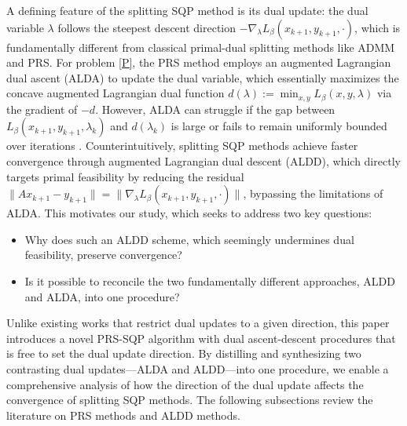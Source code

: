 \documentclass[pdflatex,sn-mathphys-num]{sn-jnl}%
\theoremstyle{thmstyleone}%
\theoremstyle{thmstyletwo}%
\theoremstyle{thmstylethree}%
\begin{document}
A defining feature of the splitting SQP method is its dual update: the dual variable $\lambda$ follows the steepest descent direction $-\nabla_\lambda L_{\beta}(x_{k+1},y_{k+1},\cdot)$, which is fundamentally different from classical primal-dual splitting methods like ADMM and PRS. 
For problem \eqref{P}, the PRS method employs an augmented Lagrangian dual ascent (ALDA) to update the dual variable, which essentially maximizes the concave augmented Lagrangian dual function $d(\lambda):=\min_{x,y} L_{\beta}(x,y,\lambda)$ via the gradient of $-d$. However, ALDA can struggle if the gap between $L_{\beta}(x_{k+1},y_{k+1},\lambda_k)$ and $d(\lambda_k)$ is large or fails to remain uniformly bounded over iterations \cite{SS24}. Counterintuitively, splitting SQP methods achieve faster convergence through augmented Lagrangian dual descent (ALDD), which directly targets primal feasibility by reducing the residual $\|Ax_{k+1}-y_{k+1}\|=\|\nabla_\lambda L_{\beta}(x_{k+1},y_{k+1},\cdot)\|$, bypassing the limitations of ALDA.
This motivates our study, which seeks to address two key questions:
\begin{itemize}
	\item Why does such an ALDD scheme, which seemingly undermines dual feasibility, preserve convergence?
	
	\item Is it possible to reconcile the two fundamentally different approaches, ALDD and ALDA, into one procedure?
\end{itemize}
Unlike existing works \cite{JZY20,JLY21,JZY22,JMX24,JCT23,SS24} that restrict dual updates to a given direction, this paper introduces a novel PRS-SQP algorithm with dual ascent-descent procedures that is free to set the dual update direction. 
By distilling and synthesizing two contrasting dual updates---ALDA and ALDD---into one procedure, we enable a comprehensive analysis of how the direction of the dual update affects the convergence of splitting SQP methods.
The following subsections review the literature on PRS methods and ALDD methods.
\end{document}
